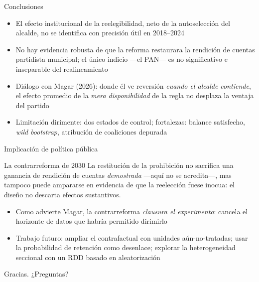 \documentclass[
  aspectratio=43,        %
  t,                     %
  10pt                   %
]{beamer}
\begin{document}
\begin{frame}{Conclusiones}

  \begin{itemize}
    \item El efecto institucional de la reelegibilidad, neto de la autoselección
          del alcalde, \textcolor{ITAMmaroon}{no se identifica con precisión
          útil} en 2018--2024
    \item No hay evidencia robusta de que la reforma restaurara la rendición de
          cuentas partidista municipal; el único indicio —el PAN— es no
          significativo e inseparable del realineamiento
    \item Diálogo con Magar (2026): donde él ve reversión \emph{cuando el alcalde
          contiende}, el efecto promedio de la \emph{mera disponibilidad} de la
          regla no desplaza la ventaja del partido
    \item Limitación dirimente: \textcolor{ITAMmaroon}{dos estados de control};
          fortalezas: balance satisfecho, \emph{wild bootstrap}, atribución de
          coaliciones depurada
  \end{itemize}

\end{frame}

\begin{frame}{Implicación de política pública}

  \begin{block}{La contrarreforma de 2030}
    La restitución de la prohibición no sacrifica una ganancia de rendición de
    cuentas \emph{demostrada} —aquí no se acredita—, mas tampoco puede ampararse
    en evidencia de que la reelección fuese inocua: el diseño no descarta efectos
    sustantivos.
  \end{block}

  \vspace{0.4em}
  \begin{itemize}
    \item Como advierte Magar, la contrarreforma \emph{clausura el experimento}:
          cancela el horizonte de datos que habría permitido dirimirlo
    \item \textcolor{ITAMgreen}{Trabajo futuro}: ampliar el contrafactual con
          unidades aún-no-tratadas; usar la probabilidad de retención como
          desenlace; explorar la heterogeneidad seccional con un RDD basado en
          aleatorización
  \end{itemize}

  \vspace{0.5em}
  \centering
  {\large \textcolor{ITAMgreen}{Gracias. ¿Preguntas?}}

\end{frame}
\end{document}
